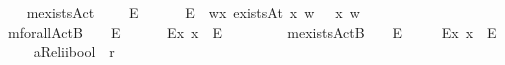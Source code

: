 \begin{isabellebody}
\ \ \isamarkupfalse%
\ mexistsAct\ \ \ {\isacharcolon}{\isacharcolon}\ {\isachardoublequoteopen}{\isasymup}{\isasymlangle}{\isasymup}{\isasymlangle}{\isasymzero}{\isasymrangle}{\isasymrangle}{\isachardoublequoteclose}\ {\isacharparenleft}{\isachardoublequoteopen}\isactrlbold {\isasymexists}\isactrlsup E{\isachardoublequoteclose}{\isacharparenright}\ \isanewline
\ \ \ \ \ {\isachardoublequoteopen}\isactrlbold {\isasymexists}\isactrlsup E{\isasymPhi}\ {\isasymequiv}\ {\isasymlambda}w{\isachardot}{\isasymexists}x{\isachardot}\ {\isacharparenleft}existsAt\ x\ w{\isacharparenright}\ {\isasymand}\ {\isacharparenleft}{\isasymPhi}\ x\ w{\isacharparenright}{\isachardoublequoteclose}\isanewline
\isanewline
\ \ \isamarkupfalse%
\ mforallActB\ \ {\isacharcolon}{\isacharcolon}\ {\isachardoublequoteopen}{\isasymup}{\isasymlangle}{\isasymup}{\isasymlangle}{\isasymzero}{\isasymrangle}{\isasymrangle}{\isachardoublequoteclose}\ {\isacharparenleft}\isactrlbold {\isasymforall}\isactrlsup E{\isachardoublequoteclose}{\isacharbrackleft}{}{\isacharbrackright}{}{\isacharparenright}\ %
\isanewline
\ \ \ \ \ {\isachardoublequoteopen}\isactrlbold {\isasymforall}\isactrlsup Ex{\isachardot}\ {\isasymphi}{\isacharparenleft}x{\isacharparenright}\ {\isasymequiv}\ \isactrlbold {\isasymforall}\isactrlsup E{\isasymphi}{\isachardoublequoteclose}\ \ \ \ \ \isanewline
\ \ \isamarkupfalse%
\ mexistsActB\ \ {\isacharcolon}{\isacharcolon}\ {\isachardoublequoteopen}{\isasymup}{\isasymlangle}{\isasymup}{\isasymlangle}{\isasymzero}{\isasymrangle}{\isasymrangle}{\isachardoublequoteclose}\ {\isacharparenleft}\isactrlbold {\isasymexists}\isactrlsup E{\isachardoublequoteclose}{\isacharbrackleft}{}{\isacharbrackright}{}{\isacharparenright}\isanewline
\ \ \ \ \ {\isachardoublequoteopen}\isactrlbold {\isasymexists}\isactrlsup Ex{\isachardot}\ {\isasymphi}{\isacharparenleft}x{\isacharparenright}\ {\isasymequiv}\ \isactrlbold {\isasymexists}\isactrlsup E{\isasymphi}{\isachardoublequoteclose}%
\isamarkuptrue%
\ \ \ \isamarkupfalse%
\ aRel{\isacharcolon}{\isacharcolon}{\isachardoublequoteopen}i{\isasymRightarrow}i{\isasymRightarrow}bool{\isachardoublequoteclose}\ {\isacharparenleft}\ {\isachardoublequoteopen}r{\isachardoublequoteclose}\ {}{}{\isacharparenright}\ \ %

\end{isabellebody}
